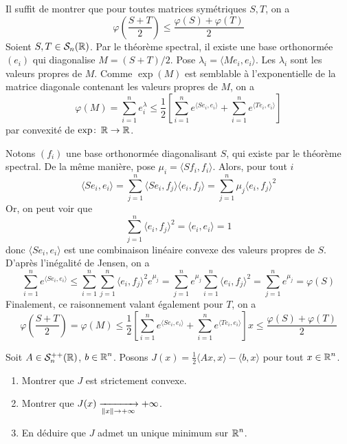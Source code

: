 \begin{solution}
	Il suffit de montrer que pour toutes matrices symétriques $S,T$, on a 
	\[
		\varphi\left(\frac{S+T}2\right)\leq \frac{\varphi(S) + \varphi(T)}2
	\]
	Soient $S,T\in \mathcal S_n(\operatorname{\mathbb R})$. 
	Par le théorème spectral, il existe une base orthonormée $(e_i)$ qui diagonalise 
	$M=(S+T)/2$. Pose $\lambda_i = \langle M e_i, e_i\rangle$. 
	Les $\lambda_i$ sont les valeurs propres de $M$. 
	Comme $\exp(M)$ est semblable à l'exponentielle de la matrice diagonale contenant les valeurs propres de $M$, on a 
	\[
		\varphi(M) = \sum_{i=1}^n e^\lambda_i \leq \frac12\left[\sum_{i=1}^n e^{\langle Se_i,e_i\rangle} + \sum_{i=1}^n e^{\langle Te_i,e_i\rangle} \right]
	\]
	par convexité de $\exp\colon\operatorname{\mathbb R}\to\operatorname{\mathbb R}$.

	Notons $(f_i)$ une base orthonormée diagonalisant $S$, qui existe par le théorème spectral. 
	De la même manière, pose $\mu_i = \langle Sf_i,f_i\rangle$. 
	Alors, pour tout $i$ 
	\[
		\langle Se_i,e_i\rangle = \sum_{j=1}^n \langle Se_i,f_j\rangle\langle e_i,f_j\rangle = \sum_{j=1}^n \mu_j\langle e_i,f_j\rangle^2 
	\]
	Or, on peut voir que 
	\[
		\sum_{j=1}^n \langle e_i,f_j\rangle^2 = \langle e_i,e_i\rangle = 1 
	\]
	donc $\langle Se_i,e_i\rangle$ est une combinaison linéaire convexe des valeurs propres de $S$. 
	D'après l'inégalité de Jensen, on a 
	\[
		\sum_{i=1}^n e^{\langle Se_i,e_i\rangle}\leq\sum_{i=1}^n \sum_{j=1}^n \langle e_i,f_j\rangle^2e^{\mu_j} = \sum_{j=1}^ne^{\mu_j} \sum_{i=1}^n \langle e_i,f_j\rangle^2 = \sum_{j=1}^ne^{\mu_j} = \varphi(S)
	\]
	Finalement, ce raisonnement valant également pour $T$, on a 
	\[
		\varphi\left(\frac{S+T}2\right) = \varphi(M) \leq \frac12\left[\sum_{i=1}^n e^{\langle Se_i,e_i\rangle} + \sum_{i=1}^n e^{\langle Te_i,e_i\rangle}\right]x\leq \frac{\varphi(S) + \varphi(T)}2 
	\]
\end{solution}

\begin{exo}[Convexité 2]
	\label{euclidiens5}
	Soit $A\in\mathcal S_n^{++}(\operatorname{\mathbb R})$, $b\in\operatorname{\mathbb R}^n$.
	Posons $J(x)=\frac12\langle Ax,x\rangle - \langle b,x\rangle$ pour tout $x\in\operatorname{\mathbb R}^n$.
	\begin{enumerate}
		\item Montrer que $J$ est strictement convexe.
		\item Montrer que $J(x)\xrightarrow[\lVert x\rVert\to+\infty]{}+\infty$.
		\item En déduire que $J$ admet un unique minimum sur $\operatorname{\mathbb R}^n$.
	\end{enumerate}
\end{exo}


